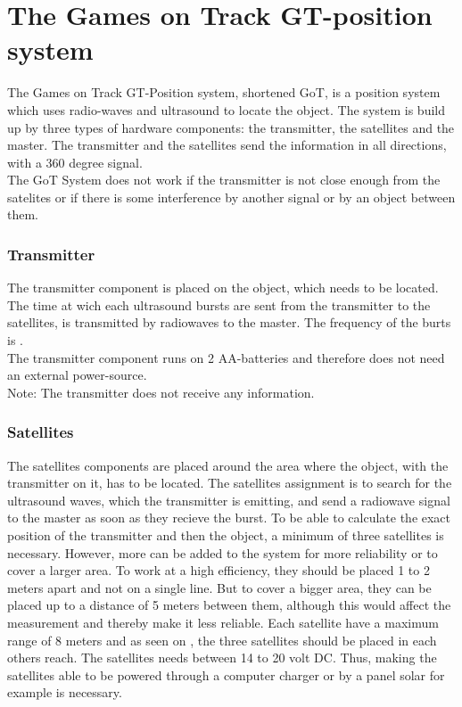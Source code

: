 \section{The Games on Track GT-position system}
The Games on Track GT-Position system, shortened GoT, is a position system which uses radio-waves and ultrasound to locate the object. The system is build up by three types of hardware components: the transmitter, the satellites and the master. The transmitter and the satellites send the information in all directions, with a 360 degree signal.\\
The GoT System does not work if the transmitter is not close enough from the satelites or if there is some interference by another signal or by an object between them.

\subsubsection{Transmitter}
The transmitter component is placed on the object, which needs to be located. The time at wich each ultrasound bursts are sent from the transmitter to the satellites, is transmitted by radiowaves to the master. The frequency of the burts is .\\
The transmitter component runs on 2 AA-batteries and therefore does not need an external power-source.\\
Note: The transmitter does not receive any information.

\subsubsection{Satellites}
The satellites components are placed around the area where the object, with the transmitter on it, has to be located. The satellites assignment is to search for the ultrasound waves, which the transmitter is emitting, and send a radiowave signal to the master as soon as they recieve the burst.
To be able to calculate the exact position of the transmitter and then the object, a minimum of three satellites is necessary. However, more can be added to the system for more reliability or to cover a larger area. To work at a high efficiency, they should be placed 1 to 2 meters apart and not on a single line. But to cover a bigger area, they can be placed up to a distance of 5 meters between them, although this would affect the measurement and thereby make it less reliable. Each satellite have a maximum range of 8 meters and as seen on , the three satellites should be placed in each others reach. The satellites needs between 14 to 20 volt DC. Thus, making the satellites able to be powered through a computer charger or by a panel solar for example is necessary.

